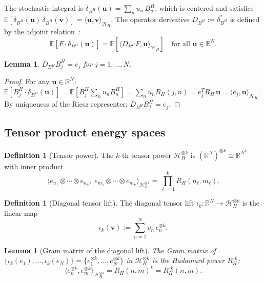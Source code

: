 \documentclass[11pt,a4paper]{article}
\theoremstyle{plain}
\newtheorem{lemma}[theorem]{Lemma}
\theoremstyle{definition}
\newtheorem{definition}[theorem]{Definition}
\theoremstyle{remark}
\newcommand{\E}{\mathbb{E}}
\newcommand{\R}{\mathbb{R}}
\newcommand{\HH}{\mathcal{H}_H}
\begin{document}
The stochastic integral is
$\delta_{B^H}(\mathbf{u}) = \sum_n u_n\,B_n^H$,
which is centered and satisfies
$\E[\delta_{B^H}(\mathbf{u})\,\delta_{B^H}(\mathbf{v})]
= \langle \mathbf{u}, \mathbf{v} \rangle_{\HH}$.
The operator derivative $D_{B^H} := \delta_{B^H}^*$
is defined by the adjoint relation~\cite{Fontes2026opderiv}:
\begin{equation}\label{eq:adj}
  \E[F \cdot \delta_{B^H}(\mathbf{u})]
  = \E[\langle D_{B^H} F, \mathbf{u} \rangle_{\HH}]
  \quad \text{for all } \mathbf{u} \in \R^N.
\end{equation}

\begin{lemma}\label{lem:D-of-BH}
$D_{B^H} B_j^H = e_j$ for $j = 1,\ldots,N$.
\end{lemma}

\begin{proof}
For any $\mathbf{u} \in \R^N$:
$\E[B_j^H \cdot \delta_{B^H}(\mathbf{u})]
= \E[B_j^H \sum_n u_n B_n^H]
= \sum_n u_n R_H(j,n)
= e_j^T R_H\,\mathbf{u}
= \langle e_j, \mathbf{u} \rangle_{\HH}$.
By uniqueness of the Riesz representer:
$D_{B^H} B_j^H = e_j$.
\end{proof}


\subsection{Tensor product energy spaces}

\begin{definition}[Tensor power]\label{def:tensor}
The $k$-th tensor power $\HH^{\otimes k}$ is
$(\R^N)^{\otimes k} \cong \R^{N^k}$ with inner product
\begin{equation}\label{eq:tensor-ip}
  \langle e_{n_1} \otimes \cdots \otimes e_{n_k},\;
         e_{m_1} \otimes \cdots \otimes e_{m_k}
  \rangle_{\HH^{\otimes k}}
  = \prod_{\ell=1}^k R_H(n_\ell, m_\ell).
\end{equation}
\end{definition}

\begin{definition}[Diagonal tensor lift]\label{def:lift}
The diagonal tensor lift
$\iota_k\colon \R^N \to \HH^{\otimes k}$ is the linear map
\begin{equation}\label{eq:lift}
  \iota_k(\mathbf{v})
  := \sum_{n=1}^N v_n\,e_n^{\otimes k}.
\end{equation}
\end{definition}

\begin{lemma}[Gram matrix of the diagonal lift]
\label{lem:gram}
The Gram matrix of $\{\iota_k(e_1),\ldots,\iota_k(e_N)\}
= \{e_1^{\otimes k},\ldots,e_N^{\otimes k}\}$
in $\HH^{\otimes k}$ is the Hadamard power $R_H^{\circ k}$:
\begin{equation}\label{eq:gram}
  \langle e_n^{\otimes k}, e_m^{\otimes k}
  \rangle_{\HH^{\otimes k}}
  = R_H(n,m)^k
  = R_H^{\circ k}(n,m).
\end{equation}
\end{lemma}
\end{document}
